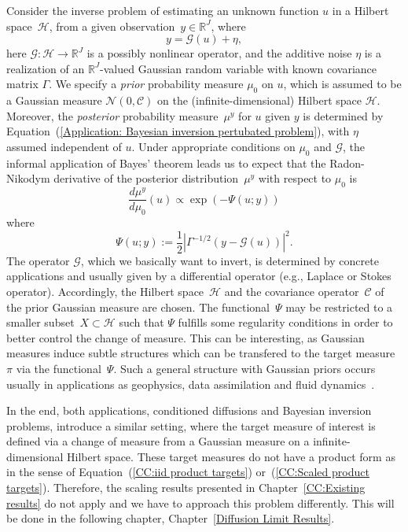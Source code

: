 Consider the inverse problem of estimating an unknown function $u$ in a Hilbert space~$\mathcal{H}$, from a given observation~$y \in \mathbb{R}^J$, where
 \begin{equation}
  \label{Application: Bayesian inversion pertubated problem}
  y = \mathcal{G}(u) + \eta,
\end{equation}
here $\mathcal{G}: \mathcal{H} \to \mathbb{R}^J$ is a possibly nonlinear operator, and the additive noise $\eta$ is a realization of an $\mathbb{R}^J$-valued Gaussian random variable with known covariance matrix $\Gamma$. We specify a \textit{prior} probability measure $\mu_0$  on $u$, which is assumed to be a Gaussian measure $ \mathcal{N}(0, \mathcal{C}) $ on the (infinite-dimensional) Hilbert space $\mathcal{H}$. Moreover, the \textit{posterior} probability measure~$\mu^y$ for $u$ given $y$ is determined by Equation~(\ref{Application: Bayesian inversion pertubated problem}), with $\eta$ assumed independent of $u$. Under appropriate conditions on $\mu_0$ and $\mathcal{G}$, the informal application of Bayes' theorem leads us to expect that the Radon-Nikodym derivative of the posterior distribution~$\mu^y$ with respect to $\mu_0$ is
\begin{equation}
 \frac{d \mu^y}{d \mu_0}(u) \varpropto \exp (- \Psi(u; y))
\end{equation}
where
\begin{equation}
 \Psi (u;y) := \frac{1}{2} \left| \Gamma^{-1/2} (y- \mathcal{G}(u)) \right|^2.
\end{equation}
The operator $\mathcal{G}$, which we basically want to invert, is determined by concrete applications and usually given by a differential operator (e.g., Laplace or Stokes operator). Accordingly, the Hilbert space~$\mathcal{H}$ and the covariance operator~$\mathcal{C}$ of the prior Gaussian measure are chosen. The functional~$\Psi$ may be restricted to a smaller subset~$X \subset \mathcal{H}$ such that $\Psi$ fulfills some regularity conditions in order to better control the change of measure. This can be interesting, as Gaussian measures induce subtle structures which can be transfered to the target measure~$\pi$ via the functional~$\Psi$. Such a general structure with Gaussian priors occurs usually in applications as geophysics, data assimilation and fluid dynamics~\autocite{Beskos2009, Dashti2012, Stuart2010}.
\newline

In the end, both applications, conditioned diffusions and Bayesian inversion problems, introduce a similar setting, where the target measure of interest is defined via a change of measure from a Gaussian measure on a infinite-dimensional Hilbert space. These target measures do not have a product form as in the sense of Equation~(\ref{CC:iid product targets}) or~(\ref{CC:Scaled product targets}). Therefore, the scaling results presented in Chapter~\ref{CC:Existing results} do not apply and we have to approach this problem differently. This will be done in the following chapter,  Chapter~\ref{Diffusion Limit Results}.
